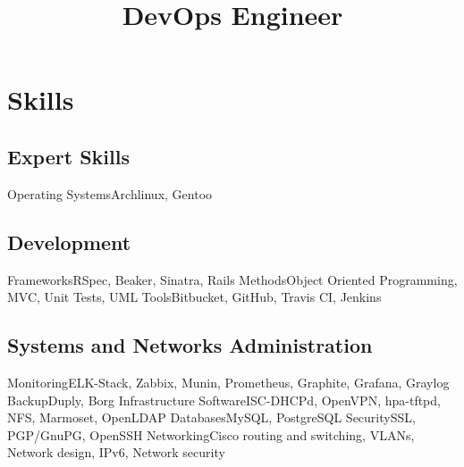 \documentclass[11pt,a4paper,nolmodern]{moderncv}
\title{DevOps Engineer}
\begin{document}
\setmainfont{TeX Gyre Pagella}

\maketitle

\section{Skills}

\subsection{Expert Skills}
           {Operating Systems}{Archlinux\contributor, Gentoo}

\subsection{Development}
           {Frameworks}{RSpec, Beaker, Sinatra, Rails}
           {Methods}{Object Oriented Programming, MVC, Unit Tests, UML}
           {Tools}{Bitbucket, GitHub, Travis CI, Jenkins}

\subsection{Systems and Networks Administration}
           {Monitoring}{ELK-Stack, Zabbix, Munin, Prometheus, Graphite, Grafana, Graylog}
           {Backup}{Duply, Borg}
           {Infrastructure Software}{ISC-DHCPd, OpenVPN, hpa-tftpd, NFS, Marmoset, OpenLDAP}
           {Databases}{MySQL, PostgreSQL}
           {Security}{SSL, PGP/GnuPG, OpenSSH}
           {Networking}{Cisco routing and switching, VLANs, Network design, IPv6, Network security}
\end{document}
